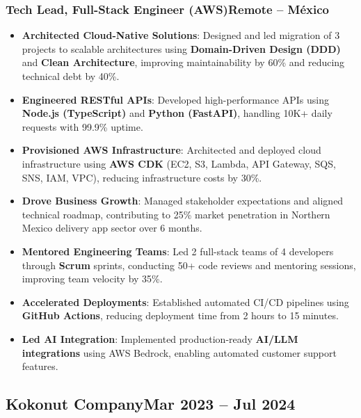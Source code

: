 \documentclass[a4paper,10pt]{article}
\newcommand{\kw}[1]{\textbf{\textcolor{keyword}{#1}}}
\newcommand{\tech}[1]{\textbf{\textcolor{tech}{#1}}}
\begin{document}
\subsubsection*{Tech Lead, Full-Stack Engineer (AWS)\hfill Remote -- México}
\begin{itemize}[noitemsep, leftmargin=*]
    \item \textbf{Architected Cloud-Native Solutions}: Designed and led migration of 3 projects to scalable architectures using \kw{Domain-Driven Design (DDD)} and \kw{Clean Architecture}, improving maintainability by 60\% and reducing technical debt by 40\%.
    \item \textbf{Engineered RESTful APIs}: Developed high-performance APIs using \tech{Node.js (TypeScript)} and \tech{Python (FastAPI)}, handling 10K+ daily requests with 99.9\% uptime.
    \item \textbf{Provisioned AWS Infrastructure}: Architected and deployed cloud infrastructure using \tech{AWS CDK} (EC2, S3, Lambda, API Gateway, SQS, SNS, IAM, VPC), reducing infrastructure costs by 30\%.
    \item \textbf{Drove Business Growth}: Managed stakeholder expectations and aligned technical roadmap, contributing to 25\% market penetration in Northern Mexico delivery app sector over 6 months.
    \item \textbf{Mentored Engineering Teams}: Led 2 full-stack teams of 4 developers through \kw{Scrum} sprints, conducting 50+ code reviews and mentoring sessions, improving team velocity by 35\%.
    \item \textbf{Accelerated Deployments}: Established automated CI/CD pipelines using \tech{GitHub Actions}, reducing deployment time from 2 hours to 15 minutes.
    \item \textbf{Led AI Integration}: Implemented production-ready \kw{AI/LLM integrations} using AWS Bedrock, enabling automated customer support features.
\end{itemize}

\subsection*{Kokonut Company\hfill\textbf{Mar 2023 -- Jul 2024}}
\end{document}
